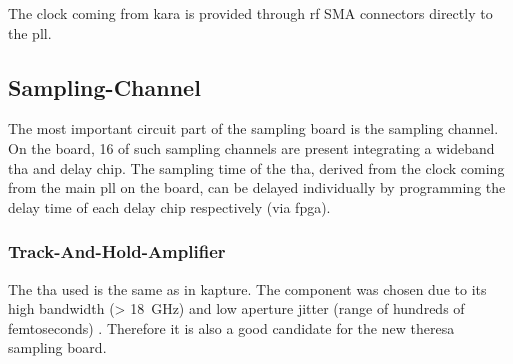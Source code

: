 The clock coming from \gls{kara} is provided through \gls{rf} SMA connectors directly to the \gls{pll}.

\subsection{Sampling-Channel}
The most important circuit part of the sampling board is the sampling channel. 
On the board, 16 of such sampling channels are present integrating a wideband \gls{tha} and delay chip.
The sampling time of the \gls{tha}, derived from the clock coming from the main \gls{pll} on the board, can be delayed individually by programming the delay time of each delay chip respectively (via \gls{fpga}). 

\subsubsection*{Track-And-Hold-Amplifier}
The \gls{tha} used is the same as in \gls{kapture}. 
The component was chosen due to its high bandwidth (> \SI{18}{\GHz}) and low aperture jitter (range of hundreds of femtoseconds) \cite{caselle2013} . 
Therefore it is also a good candidate for the new \gls{theresa} sampling board.


